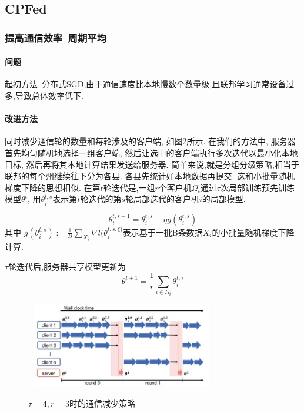 \documentclass[a4paper]{article}
\theoremstyle{definition}
\numberwithin{equation}{section}
\begin{document}
\subsection{CPFed}

\subsubsection{提高通信效率--周期平均}
\paragraph{问题} 起初方法--分布式SGD,由于通信速度比本地慢数个数量级,且联邦学习通常设备过多,导致总体效率低下.

\paragraph{改进方法}
同时减少通信轮的数量和每轮涉及的客户端, 如图2所示. 在我们的方法中, 服务器首先均匀随机地选择一组客户端, 然后让选中的客户端执行多次迭代以最小化本地目标, 然后再将其本地计算结果发送给服务器. 
简单来说,就是分组分级策略,相当于联邦的每个州继续往下分为各县. 各县先统计好本地数据再提交. 这和小批量随机梯度下降的思想相似.
在第$t$轮迭代是,一组$r$个客户机$\Omega_t$通过$\tau$次局部训练预先训练模型$\theta^t$,
用$\theta_i^{t,s}$表示第$t$轮迭代的第$s$轮局部迭代的客户机$i$的局部模型.

\begin{equation}
    \theta^{t,s+1}_i= \theta_i^{t,s}- \eta g(\theta_i^{t,s})
\end{equation}
其中 $g(\theta_i^{t,s}) := \frac{1}{B} \sum_{X_i} \nabla l(\theta_i^{t,s,\xi)}$表示基于一批B条数据$X_i$的小批量随机梯度下降计算. 

$\tau$轮迭代后,服务器共享模型更新为 
\begin{equation}
    \theta^{t+1}=\frac{1}{r} \sum_{i\in \Omega_t} \theta_i^{t,\tau} 
\end{equation}
 

\begin{figure}[ht]
    \
    \setlength{\abovecaptionskip}{0.1cm}
    \centering    
    \includegraphics[width=0.7\textwidth]{CPFed/communication-reduction.jpg}
    \label{communication-reduction-strategies}
    \caption{$\tau=4,r=3 $时的通信减少策略}
\end{figure}
 
\end{document}
